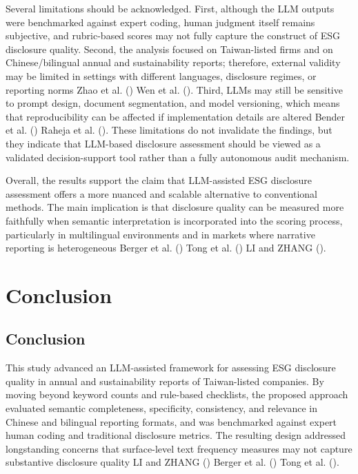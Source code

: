 \documentclass[
  12pt,
]{article}
\begin{document}
Several limitations should be acknowledged. First, although the LLM
outputs were benchmarked against expert coding, human judgment itself
remains subjective, and rubric-based scores may not fully capture the
construct of ESG disclosure quality. Second, the analysis focused on
Taiwan-listed firms and on Chinese/bilingual annual and sustainability
reports; therefore, external validity may be limited in settings with
different languages, disclosure regimes, or reporting norms Zhao et al.
() Wen et al.
(). Third, LLMs may still be sensitive to
prompt design, document segmentation, and model versioning, which means
that reproducibility can be affected if implementation details are
altered Bender et al. () Raheja et al.
(). These limitations do not invalidate
the findings, but they indicate that LLM-based disclosure assessment
should be viewed as a validated decision-support tool rather than a
fully autonomous audit mechanism.

Overall, the results support the claim that LLM-assisted ESG disclosure
assessment offers a more nuanced and scalable alternative to
conventional methods. The main implication is that disclosure quality
can be measured more faithfully when semantic interpretation is
incorporated into the scoring process, particularly in multilingual
environments and in markets where narrative reporting is heterogeneous
Berger et al. () Tong et al.
() LI and ZHANG
().

\section{Conclusion}\label{conclusion}

\subsection{Conclusion}\label{conclusion-1}

This study advanced an LLM-assisted framework for assessing ESG
disclosure quality in annual and sustainability reports of Taiwan-listed
companies. By moving beyond keyword counts and rule-based checklists,
the proposed approach evaluated semantic completeness, specificity,
consistency, and relevance in Chinese and bilingual reporting formats,
and was benchmarked against expert human coding and traditional
disclosure metrics. The resulting design addressed longstanding concerns
that surface-level text frequency measures may not capture substantive
disclosure quality LI and ZHANG () Berger et
al. () Tong et al.
().
\end{document}
